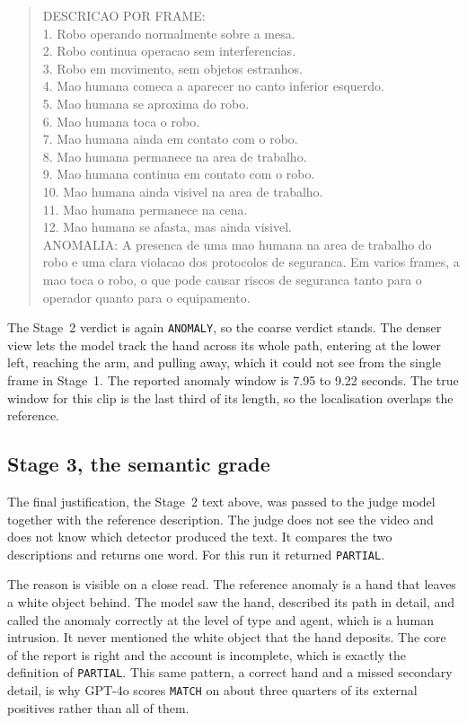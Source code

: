 \begin{quote}\small\ttfamily
DESCRICAO POR FRAME:\\
1. Robo operando normalmente sobre a mesa.\\
2. Robo continua operacao sem interferencias.\\
3. Robo em movimento, sem objetos estranhos.\\
4. Mao humana comeca a aparecer no canto inferior esquerdo.\\
5. Mao humana se aproxima do robo.\\
6. Mao humana toca o robo.\\
7. Mao humana ainda em contato com o robo.\\
8. Mao humana permanece na area de trabalho.\\
9. Mao humana continua em contato com o robo.\\
10. Mao humana ainda visivel na area de trabalho.\\
11. Mao humana permanece na cena.\\
12. Mao humana se afasta, mas ainda visivel.\\[4pt]
ANOMALIA: A presenca de uma mao humana na area de trabalho do robo e uma
clara violacao dos protocolos de seguranca. Em varios frames, a mao toca
o robo, o que pode causar riscos de seguranca tanto para o operador
quanto para o equipamento.
\end{quote}

The Stage~2 verdict is again \texttt{ANOMALY}, so the coarse verdict
stands. The denser view lets the model track the hand across its whole
path, entering at the lower left, reaching the arm, and pulling away,
which it could not see from the single frame in Stage~1. The reported
anomaly window is 7.95 to 9.22 seconds. The true window for this clip is
the last third of its length, so the localisation overlaps the reference.

\subsection{Stage 3, the semantic grade}

The final justification, the Stage~2 text above, was passed to the judge
model together with the reference description. The judge does not see the
video and does not know which detector produced the text. It compares the
two descriptions and returns one word. For this run it returned
\texttt{PARTIAL}.

The reason is visible on a close read. The reference anomaly is a hand
that leaves a white object behind. The model saw the hand, described its
path in detail, and called the anomaly correctly at the level of type and
agent, which is a human intrusion. It never mentioned the white object
that the hand deposits. The core of the report is right and the account
is incomplete, which is exactly the definition of \texttt{PARTIAL}. This
same pattern, a correct hand and a missed secondary detail, is why GPT-4o
scores \texttt{MATCH} on about three quarters of its external positives
rather than all of them.

